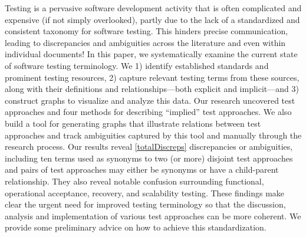 \label{abstract}%
Testing is a pervasive software development activity that is often
complicated and expensive (if not simply overlooked), partly due to
the lack of a standardized and consistent taxonomy for software testing.
This hinders precise communication, leading to discrepancies and
ambiguities across the literature and even within individual documents!
In this paper, we systematically examine the current state of software
testing terminology. We 1) identify established standards
and prominent testing resources, 2) capture relevant testing terms
from these sources, along with their definitions and relationships---both
explicit and implicit---and 3) construct graphs to visualize and analyze
this data. Our research uncovered \approachCount{} test approaches and
four methods for describing ``implied'' test approaches. We also build
a tool for generating graphs that illustrate relations between test
approaches and track ambiguities captured by this tool and manually through
the research process. Our results reveal \ref*{totalDiscreps} discrepancies
or ambiguities, including ten terms used as synonyms to two (or more)
disjoint test approaches and \parSynCount{} pairs of test approaches may
either be synonyms or have a child-parent relationship. They also reveal
notable confusion surrounding functional, operational acceptance, recovery,
and scalability testing. These findings make clear
the urgent need for improved testing terminology so that the discussion,
analysis and implementation of various test approaches can be more coherent.
We provide some preliminary advice on how to achieve this standardization.